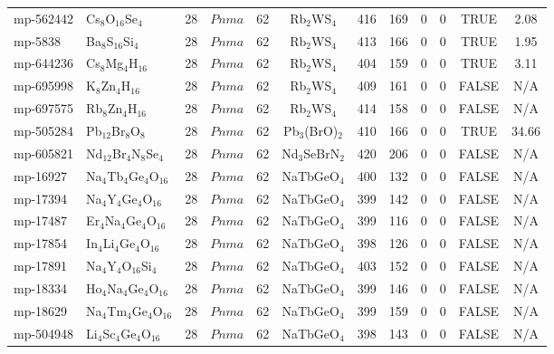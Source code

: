 {\begin{longtable}{llcccccccccc}
    mp-562442 & Cs$_{8}$O$_{16}$Se$_{4}$ & 28    & $Pnma$ & 62    & Rb$_{2}$WS$_{4}$ & 416   & 169   & 0     & 0     & TRUE  & 2.08  \\
    mp-5838 & Ba$_{8}$S$_{16}$Si$_{4}$ & 28    & $Pnma$ & 62    & Rb$_{2}$WS$_{4}$ & 413   & 166   & 0     & 0     & TRUE  & 1.95  \\
    mp-644236 & Cs$_{8}$Mg$_{4}$H$_{16}$ & 28    & $Pnma$ & 62    & Rb$_{2}$WS$_{4}$ & 404   & 159   & 0     & 0     & TRUE  & 3.11  \\
    mp-695998 & K$_{8}$Zn$_{4}$H$_{16}$ & 28    & $Pnma$ & 62    & Rb$_{2}$WS$_{4}$ & 409   & 161   & 0     & 0     & FALSE & N/A \\
    mp-697575 & Rb$_{8}$Zn$_{4}$H$_{16}$ & 28    & $Pnma$ & 62    & Rb$_{2}$WS$_{4}$ & 414   & 158   & 0     & 0     & FALSE & N/A \\
    mp-505284 & Pb$_{12}$Br$_{8}$O$_{8}$ & 28    & $Pnma$ & 62    & Pb$_{3}$(BrO)$_{2}$ & 410   & 166   & 0     & 0     & TRUE  & 34.66  \\
    mp-605821 & Nd$_{12}$Br$_{4}$N$_{8}$Se$_{4}$ & 28    & $Pnma$ & 62    & Nd$_{3}$SeBrN$_{2}$ & 420   & 206   & 0     & 0     & FALSE & N/A \\
    mp-16927 & Na$_{4}$Tb$_{4}$Ge$_{4}$O$_{16}$ & 28    & $Pnma$ & 62    & NaTbGeO$_{4}$ & 400   & 132   & 0     & 0     & FALSE & N/A \\
    mp-17394 & Na$_{4}$Y$_{4}$Ge$_{4}$O$_{16}$ & 28    & $Pnma$ & 62    & NaTbGeO$_{4}$ & 399   & 142   & 0     & 0     & FALSE & N/A \\
    mp-17487 & Er$_{4}$Na$_{4}$Ge$_{4}$O$_{16}$ & 28    & $Pnma$ & 62    & NaTbGeO$_{4}$ & 399   & 116   & 0     & 0     & FALSE & N/A \\
    mp-17854 & In$_{4}$Li$_{4}$Ge$_{4}$O$_{16}$ & 28    & $Pnma$ & 62    & NaTbGeO$_{4}$ & 398   & 126   & 0     & 0     & FALSE & N/A \\
    mp-17891 & Na$_{4}$Y$_{4}$O$_{16}$Si$_{4}$ & 28    & $Pnma$ & 62    & NaTbGeO$_{4}$ & 403   & 152   & 0     & 0     & FALSE & N/A \\
    mp-18334 & Ho$_{4}$Na$_{4}$Ge$_{4}$O$_{16}$ & 28    & $Pnma$ & 62    & NaTbGeO$_{4}$ & 399   & 146   & 0     & 0     & FALSE & N/A \\
    mp-18629 & Na$_{4}$Tm$_{4}$Ge$_{4}$O$_{16}$ & 28    & $Pnma$ & 62    & NaTbGeO$_{4}$ & 399   & 159   & 0     & 0     & FALSE & N/A \\
    mp-504948 & Li$_{4}$Sc$_{4}$Ge$_{4}$O$_{16}$ & 28    & $Pnma$ & 62    & NaTbGeO$_{4}$ & 398   & 143   & 0     & 0     & FALSE & N/A \\

\end{longtable}}
